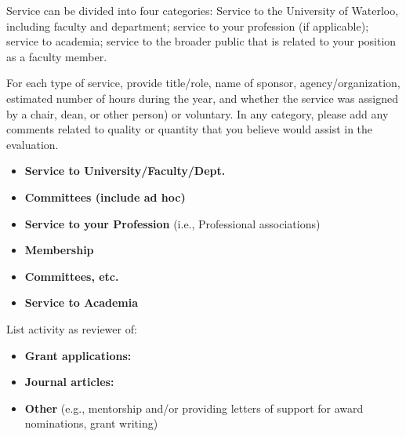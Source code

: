 \documentclass[12pt,letterpaper]{article}
\begin{document}
Service can be divided into four categories: Service to the University of Waterloo, including faculty and department; service to your profession (if applicable); service to academia; service to the broader public that is related to your position as a faculty member.

For each type of service, provide title/role, name of sponsor, agency/organization, estimated number of hours during the year, and whether the service was assigned by a chair, dean, or other person) or voluntary. In any category, please add any comments related to quality or quantity that you believe would assist in the evaluation.

\begin{itemize}
\item \textbf{Service to University/Faculty/Dept.}
\item \textbf{Committees (include ad hoc)}
\end{itemize}
\APRServiceUniversity

\begin{itemize}
\item \textbf{Service to your Profession} (i.e., Professional associations)
\item \textbf{Membership}
\end{itemize}
\APRServiceProfessionMembership

\begin{itemize}
\item \textbf{Committees, etc.}
\end{itemize}
\APRServiceProfessionCommittees

\begin{itemize}
\item \textbf{Service to Academia}
\end{itemize}

List activity as reviewer of:

\begin{itemize}
\item \textbf{Grant applications:}
\end{itemize}
\APRServiceAcademiaGrants

\begin{itemize}
\item \textbf{Journal articles:}
\end{itemize}
\APRServiceAcademiaJournals

\begin{itemize}
\item \textbf{Other} (e.g., mentorship and/or providing letters of support for award nominations, grant writing)
\end{itemize}
\APRServiceAcademiaOther
\end{document}
